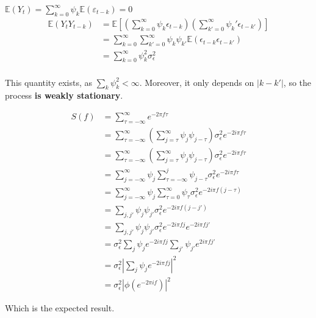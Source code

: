 \documentclass[11pt]{article}
\begin{document}
\begin{solution}  %

$\mathbb{E}(Y_t) = \sum_{k=0}^{\infty} \psi_k\mathbb{E}(\varepsilon_{t-k}) = 0 $ \\

\begin{align}
    \mathbb{E}(Y_t Y_{t-k}) &= \mathbb{E}[(\sum_{k=0}^{\infty} \psi_k \epsilon_{t-k})(\sum_{k'=0}^{\infty} \psi_k' \epsilon_{t-k'})]\\
    &= \sum_{k=0}^{\infty} \sum_{k'=0}^{\infty} \psi_k \psi_{k'} \mathbb{E}(\epsilon_{t-k} \epsilon_{t-k'}) \\
    &= \sum_{k=0}^{\infty}  \psi_k ^2 \sigma_{\epsilon}^2 \\
\end{align}

This quantity exists, as $\sum_k \psi_k^2 < \infty$. Moreover, it only depends on $| k - k' |$, so the process \textbf{is weakly stationary}. 

\begin{align}
    S(f) &= \sum_{\tau= - \infty}^{\infty} e^{-2\pi f \tau}\\
    &= \sum_{\tau=-\infty}^{\infty} (\sum_{j=\tau}^{\infty} \psi_j \psi_{j-\tau}) \sigma_\epsilon^2 e^{-2i\pi f \tau}\\
    &=\sum_{\tau=-\infty}^{\infty}(\sum_{j=\tau}^{\infty} \psi_j \psi_{j-\tau}) \sigma_\epsilon^2 e^{-2i\pi f \tau}\\
    &= \sum_{j=-\infty}^{\infty} \psi_j \sum_{\tau=-\infty}^{j}\psi_{j-\tau} \sigma_\epsilon^2 e^{-2i\pi f \tau}\\
    &= \sum_{j=-\infty}^{\infty} \psi_j \sum_{\tau=0}^{\infty}\psi_{\tau}     \sigma_\epsilon^2 e^{-2i\pi f (j-\tau)}\\
    &=\sum_{j, j'} \psi_j \psi_{j'} \sigma_\epsilon^2 e^{-2i\pi f (j-j')}\\
    &=\sum_{j, j'} \psi_j \psi_{j'} \sigma_\epsilon^2 e^{-2i\pi f j}e^{-2i\pi f j'}\\
    &=\sigma_\epsilon^2 \sum_{j} \psi_j  e^{-2i\pi f j} \sum_{j'} \psi_{j'}e^{2i\pi f j'}\\
    &=\sigma_\epsilon^2 |\sum_{j} \psi_j  e^{-2i\pi f j} | ^2\\
    &=\sigma_\epsilon^2 |\phi(e^{-2\pi i f})|^2
\end{align}

Which is the expected result. 

\end{solution}
\end{document}
